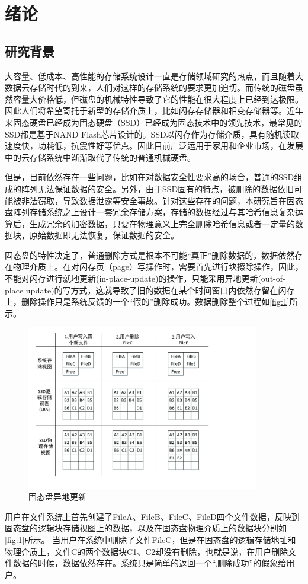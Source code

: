 
\chapter{绪论}

\section{研究背景}
大容量、低成本、高性能的存储系统设计一直是存储领域研究的热点，而且随着大数据云存储时代的到来，人们对这样的存储系统的要求更加迫切。而传统的磁盘虽然容量大价格低，但磁盘的机械特性导致了它的性能在很大程度上已经到达极限。因此人们将希望寄托于新型的存储介质上，比如闪存存储器和相变存储器等。近年来固态硬盘已经成为固态硬盘（SSD）已经成为固态技术中的领先技术，最常见的SSD都是基于NAND Flash芯片设计的。SSD以闪存作为存储介质，具有随机读取速度快，功耗低，抗震性好等优点。因此目前广泛运用于家用和企业市场，在发展中的云存储系统中渐渐取代了传统的普通机械硬盘。


但是，目前依然存在一些问题，比如在对数据安全性要求高的场合，普通的SSD组成的阵列无法保证数据的安全。另外，由于SSD固有的特点，被删除的数据依旧可能被非法窃取，导致数据泄露等安全事故。针对这些存在的问题，本研究旨在固态盘阵列存储系统之上设计一套冗余存储方案，存储的数据经过与其哈希信息复杂运算后，生成冗余的加密数据，只要在物理意义上完全删除哈希信息或者一定量的数据块，原始数据即无法恢复，保证数据的安全。


固态盘的特性决定了，普通删除方式是根本不可能“真正”删除数据的，数据依然存在物理介质上\cite{ssd-outofplace-and-trim}。在对闪存页（page）写操作时，需要首先进行块擦除操作，因此，不能对闪存进行就地更新(in-place-update)的操作，只能采用异地更新(out-of-place update)的写方式，这就导致了旧的数据在某个时间窗口内依然存留在闪存上，删除操作只是系统反馈的一个“假的”删除成功。数据删除整个过程如\autoref{fig:1}所示。
\begin{figure}
\centering
\includegraphics[width=4in]{Pics/fig-out-of-place.pdf}
\caption{固态盘异地更新}\label{fig:1}
\end{figure}
用户在文件系统上首先创建了FileA、FileB、FileC、FileD四个文件数据，反映到固态盘的逻辑块存储视图上的数据，以及在固态盘物理介质上的数据块分别如\autoref{fig:1}所示。
当用户在系统中删除了文件FileC，但是在固态盘的逻辑存储地址和物理介质上，文件C的两个数据块C1、C2却没有删除，也就是说，在用户删除文件数据的时候，数据依然存在。系统只是简单的返回一个“删除成功”的假象给用户。


